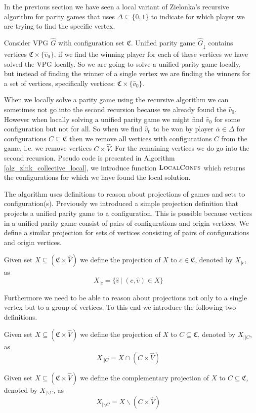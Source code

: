 In the previous section we have seen a local variant of Zielonka's recursive algorithm for parity games that uses $\Delta \subseteq \{0,1\}$ to indicate for which player we are trying to find the specific vertex.

Consider VPG $\hat{G}$ with configuration set $\mathfrak{C}$. Unified parity game $\hat{G}_{\downarrow}$ contains vertices $\mathfrak{C} \times \{\hat{v}_0\}$, if we find the winning player for each of these vertices we have solved the VPG locally. So we are going to solve a unified parity game locally, but instead of finding the winner of a single vertex we are finding the winners for a set of vertices, specifically vertices: $\mathfrak{C} \times \{\hat{v}_0\}$.

When we locally solve a parity game using the recursive algorithm we can sometimes not go into the second recursion because we already found the $\hat{v}_0$. However when locally solving a unified parity game we might find $\hat{v}_0$ for some configuration but not for all. So when we find $\hat{v}_0$ to be won by player $\overline{\alpha} \in \Delta$ for configurations $C \subseteq \mathfrak{C}$ then we remove all vertices with configurations $C$ from the game, i.e. we remove vertices $C \times \hat{V}$. For the remaining vertices we do go into the second recursion. Pseudo code is presented in Algorithm \ref{alg_zlnk_collective_local}, we introduce function $\textsc{LocalConfs}$ which returns the configurations for which we have found the local solution.

The algorithm uses definitions to reason about projections of games and sets to configuration(s). Previously we introduced a simple projection definition that projects a unified parity game to a configuration. This is possible because vertices in a unified parity game consist of pairs of configurations and origin vertices. We define a similar projection for sets of vertices consisting of pairs of configurations and origin vertices.
\begin{definition}
	Given set $X \subseteq (\mathfrak{C} \times \hat{V})$ we define the projection of $X$ to $c \in \mathfrak{C}$, denoted by $X_{|c}$, as
	\[ X_{|c} = \{ \hat{v}\ |\ (c,\hat{v}) \in X \} \]
\end{definition}
Furthermore we need to be able to reason about projections not only to a single vertex but to a group of vertices. To this end we introduce the following two definitions.
\begin{definition}
	Given set $X \subseteq (\mathfrak{C} \times \hat{V})$ we define the projection of $X$ to $C \subseteq \mathfrak{C}$, denoted by $X_{||C}$, as
	\[ X_{||C} = X \cap (C \times \hat{V}) \]
\end{definition}
\begin{definition}
Given set $X \subseteq (\mathfrak{C} \times \hat{V})$ we define the complementary projection of $X$ to $C \subseteq \mathfrak{C}$, denoted by $X_{|\backslash C}$, as
\[ X_{|\backslash C} = X \backslash (C \times \hat{V}) \]
\end{definition}

